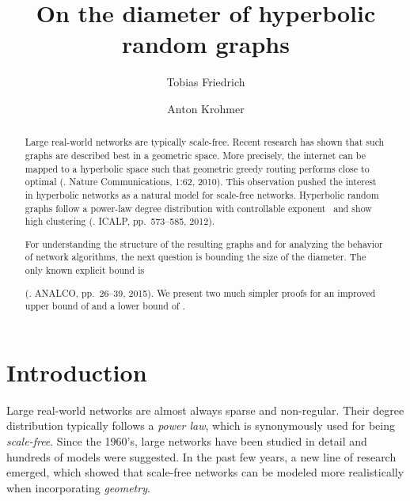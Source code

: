 \documentclass{llncs}
\begin{document}
\frontmatter

\title{On the diameter of hyperbolic random graphs}


\author{Tobias Friedrich \and Anton Krohmer}







\maketitle

\pagestyle{headings}

\begin{abstract}
Large real-world networks are typically scale-free.
Recent research has shown that such graphs are described best in a geometric space.
More precisely, the internet can be mapped to a hyperbolic space such that geometric greedy
routing performs close to optimal (\citeauthor{boguna2010sustaining}. Nature Communications, 1:62, 2010).
This observation pushed the interest in hyperbolic networks as
a natural model for scale-free networks.
Hyperbolic random graphs follow a power-law degree distribution
with controllable exponent~
and show high clustering
(\citeauthor{gugelmann2012random}. ICALP, pp.\ 573--585, 2012).

\medskip
\qquad
For understanding the structure of the resulting graphs and for analyzing the behavior of network algorithms,
the next question is bounding the size of the diameter.
The only known explicit bound is

(\citeauthor{KiwiMitsche15}. ANALCO, pp.\ 26--39, 2015).
We present two much simpler proofs for an improved upper bound of 
and a lower bound of .
\end{abstract}


\section{Introduction}

Large real-world networks are almost always sparse and non-regular. Their degree distribution
typically follows a \emph{power law}, which is synonymously used for being \emph{scale-free}.
Since the 1960's, large networks have been studied in detail and hundreds of models
were suggested. In the past few years, a new line of research emerged, which showed
that scale-free networks can be modeled more realistically when incorporating \emph{geometry}.
\end{document}
